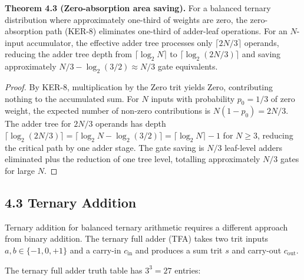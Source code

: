 \textbf{Theorem 4.3 (Zero-absorption area saving).} For a balanced
ternary distribution where approximately one-third of weights are zero,
the zero-absorption path (KER-8) eliminates one-third of adder-leaf
operations. For an \(N\)-input accumulator, the effective adder tree
processes only \(\lceil 2N/3 \rceil\) operands, reducing the adder
tree depth from \(\lceil \log_2 N \rceil\) to
\(\lceil \log_2 (2N/3) \rceil\) and saving approximately
\(N/3 - \log_2(3/2) \approx N/3\) gate equivalents.

\begin{proof}
By KER-8, multiplication by the Zero trit yields Zero, contributing
nothing to the accumulated sum. For \(N\) inputs with probability
\(p_0 = 1/3\) of zero weight, the expected number of non-zero
contributions is \(N(1 - p_0) = 2N/3\). The adder tree for \(2N/3\)
operands has depth \(\lceil \log_2(2N/3) \rceil = \lceil \log_2 N
- \log_2(3/2) \rceil = \lceil \log_2 N \rceil - 1\) for
\(N \geq 3\), reducing the critical path by one adder stage.
The gate saving is \(N/3\) leaf-level adders eliminated plus the
reduction of one tree level, totalling approximately \(N/3\) gates
for large \(N\).
\end{proof}

\subsection{4.3 Ternary Addition}

Ternary addition for balanced ternary arithmetic requires a different
approach from binary addition. The ternary full adder (TFA) takes two
trit inputs \(a, b \in \{-1, 0, +1\}\) and a carry-in \(c_{\text{in}}\)
and produces a sum trit \(s\) and carry-out \(c_{\text{out}}\).

The ternary full adder truth table has \(3^3 = 27\) entries:

